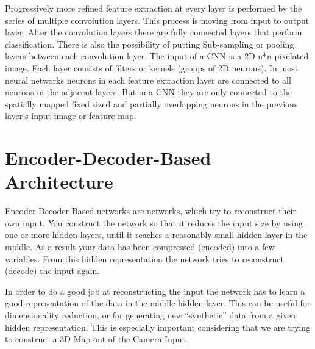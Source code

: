 Progressively more refined feature extraction at every layer is performed by the series of multiple convolution layers. This process is moving from input to output layer. After the convolution layers there are fully connected layers that perform classification. There is also the possibility of putting Sub-sampling or pooling layers between each convolution layer. The input of a CNN is a 2D n*n pixelated image. Each layer consists of filters or kernels (groups of 2D neurons). In most neural networks neurons in each feature extraction layer are connected to all neurons in the adjacent layers. But in a CNN they are only connected to the spatially mapped fixed sized and partially overlapping neurons in the previous layer’s input image or feature map.

\section{Encoder-Decoder-Based Architecture}

Encoder-Decoder-Based networks are networks, which try to reconstruct their own input. You construct the network so that it reduces the input size by using one or more hidden layers, until it reaches a reasonably small hidden layer in the middle. As a result your data has been compressed (encoded) into a few variables. From this hidden representation the network tries to reconstruct (decode) the input again.

In order to do a good job at reconstructing the input the network has to learn a good representation of the data in the middle hidden layer. This can be useful for dimensionality reduction, or for generating new “synthetic” data from a given hidden representation. This is especially important considering that we are trying to construct a 3D Map out of the Camera Input. 









